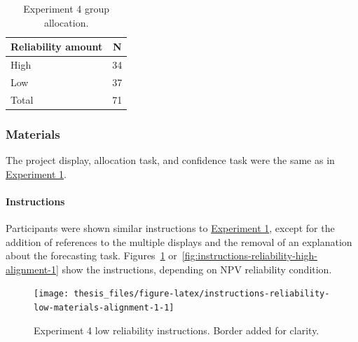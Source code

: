 \documentclass[a4paper, nobind, dvipsnames]{templates/ociamthesis}
\theoremstyle{definition}
\theoremstyle{definition}
\theoremstyle{definition}
\theoremstyle{definition}
\theoremstyle{remark}
\begin{document}
\begin{table}[tbp]

\begin{center}
\begin{threeparttable}

\caption{\label{tab:condition-allocation-alignment-1}Experiment 4 group allocation.}

\begin{tabular}{ll}
\toprule
Reliability amount & \multicolumn{1}{c}{N}\\
\midrule
High & 34\\
Low & 37\\
Total & 71\\
\bottomrule
\end{tabular}

\end{threeparttable}
\end{center}

\end{table}

\hypertarget{materials-12}{%
\subsubsection{Materials}\label{materials-12}}

The project display, allocation task, and confidence task were the same as in
\protect\hyperlink{materials-alignment-2}{Experiment 1}.

\hypertarget{instructions-7}{%
\paragraph{Instructions}\label{instructions-7}}

Participants were shown similar instructions to \protect\hyperlink{instructions-materials-alignment-2}{Experiment
1}, except for the addition of references
to the multiple displays and the removal of an explanation about the forecasting
task. Figures~\ref{fig:instructions-reliability-low-materials-alignment-1}
or~\ref{fig:instructions-reliability-high-alignment-1} show the instructions,
depending on NPV reliability condition.



\begin{figure}
\texttt{[image: thesis\_files/figure-latex/instructions-reliability-low-materials-alignment-1-1]} \caption{Experiment 4 low reliability instructions. Border added for clarity.}\label{fig:instructions-reliability-low-materials-alignment-1}
\end{figure}
\end{document}
